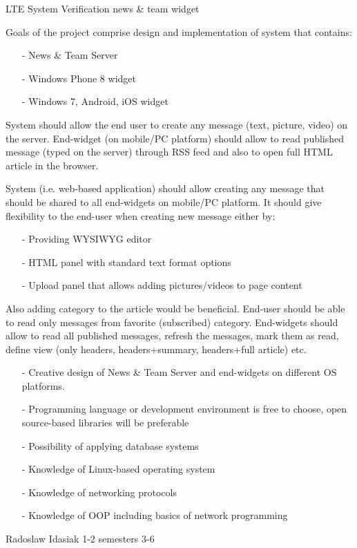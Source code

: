 \begin{project}
{LTE System Verification news \& team widget}
{
Goals of the project comprise design and implementation of system that contains:
\begin{itemize}
\item[-] News \& Team Server
\item[-] Windows Phone 8 widget
\item[-] Windows 7, Android, iOS widget
\end{itemize}
System should allow the end user to create any message (text, picture, video) on the server. 
End-widget (on mobile/PC platform) should allow to read published message (typed on the server) 
through RSS feed and also to open full HTML article in the browser. } 
{
System (i.e. web-based application) should allow creating any message that
should be shared to all end-widgets on mobile/PC platform. It should give 
flexibility to the end-user when creating new message either by: 
\begin{itemize}
\item[-] Providing WYSIWYG editor
\item[-] HTML panel with standard text format options
\item[-] Upload panel that allows adding pictures/videos to page content
\end{itemize}
Also adding category to the article would be beneficial. End-user should be able to read only messages
 from favorite (subscribed) category. End-widgets should allow to read all published messages, refresh the messages,
  mark them as read, define view (only headers, headers+summary, headers+full article) etc. }
{
\begin{itemize}
\item[-] Creative design of News \& Team Server and end-widgets on different OS
platforms.
\item[-] Programming language or development environment is free to choose, open
source-based libraries will be preferable
\item[-] Possibility of applying database systems
\item[-] Knowledge of Linux-based operating system
\item[-] Knowledge of networking protocols
\item[-] Knowledge of OOP including basics of network programming
\end{itemize}
}
{Radoslaw Idasiak}
{1-2 semesters}
{3-6}
\end{project}
